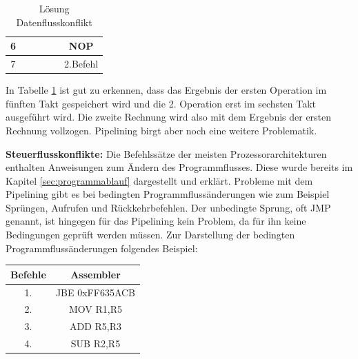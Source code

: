 \documentclass[a4paper,12pt]{article}
\begin{document}
\begin{table}[!htb]
\begin{tabular}{|c|c|c|c|c|c|}
6    &                                                            &                                                              &                                                               & \cellcolor[HTML]{9AFF99}{\color[HTML]{333333} \textbf{2.Befehl}} & NOP                                                               \\ \hline
7    &                                                            &                                                              &                                                               &                                                                  & 2.Befehl                                                          \\ \hline
\end{tabular}
\caption{Lösung Datenflusskonflikt}
\label{tab:Datenflusskonfliktloesung}
\end{table}

\noindent In Tabelle \ref{tab:Datenflusskonfliktloesung} ist gut zu erkennen, dass das Ergebnis der ersten Operation im fünften Takt gespeichert wird und die 2. Operation erst im sechsten Takt ausgeführt wird. Die zweite Rechnung wird also mit dem Ergebnis der ersten Rechnung vollzogen. Pipelining birgt aber noch eine weitere Problematik.

\par\bigskip\noindent \textbf{Steuerflusskonflikte:} Die Befehlssätze der meisten Prozessorarchitekturen enthalten Anweisungen zum Ändern des Programmflusses. Diese wurde bereits im Kapitel \ref{sec:programmablauf} dargestellt und erklärt. Probleme mit dem Pipelining gibt es bei bedingten Programmflussänderungen wie zum Beispiel Sprüngen, Aufrufen und Rückkehrbefehlen. Der unbedingte Sprung, oft JMP genannt, ist hingegen für das Pipelining kein Problem, da für ihn keine Bedingungen geprüft werden müssen. Zur Darstellung der bedingten Programmflussänderungen folgendes Beispiel:


\begin{table}[!htb]
\centering
\begin{tabular}{|c|c|}
\hline
Befehle & Assembler      \\ \hline
1.      & JBE 0xFF635ACB \\ \hline
2.      & MOV R1,R5      \\ \hline
3.      & ADD R5,R3      \\ \hline
4.      & SUB R2,R5      \\ \hline
\end{tabular}
\end{table}
\end{document}
